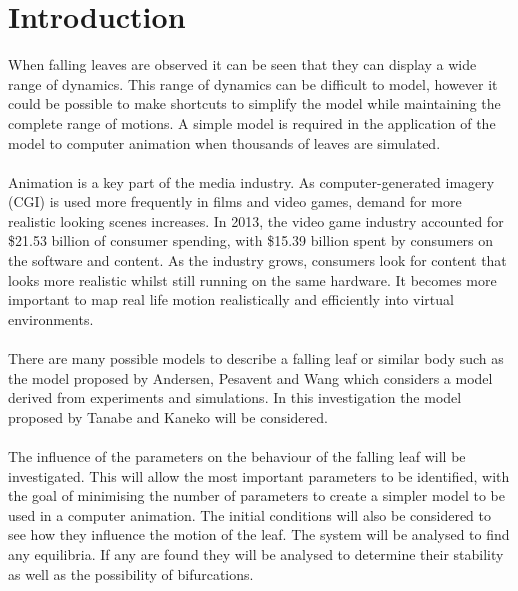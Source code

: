 \section{Introduction}
When falling leaves are observed it can be seen that they can display a wide range of dynamics. This range of dynamics can be difficult to model, however it could be possible to make shortcuts to simplify the model while maintaining the complete range of motions. A simple model is required in the application of the model to computer animation when thousands of leaves are simulated. 
\\
\\
\noindent Animation is a key part of the media industry. As computer-generated imagery (CGI) is used more frequently in films and video games, demand for more realistic looking scenes increases. In 2013, the video game industry accounted for \$21.53 billion of consumer spending, with \$15.39 billion spent by consumers on the software and content\textsuperscript{\cite{videogameindustry}}. As the industry grows, consumers look for content that looks more realistic whilst still running on the same hardware. It becomes more important to map real life motion realistically and efficiently into virtual environments. 
\\
\\
\noindent There are many possible models to describe a falling leaf or similar body such as the model proposed by Andersen, Pesavent and Wang which considers a model derived from experiments and simulations\textsuperscript{\cite{andersen2005analysis}}. In this investigation the model proposed by Tanabe and Kaneko will be considered\textsuperscript{\cite{tanabe1994behavior}}.
\\
\\
The influence of the parameters on the behaviour of the falling leaf will be investigated. This will allow the most important parameters to be identified, with the goal of minimising the number of parameters to create a simpler model to be used in a computer animation. The initial conditions will also be considered to see how they influence the motion of the leaf. The system will be analysed to find any equilibria. If any are found they will be analysed to determine their stability as well as the possibility of bifurcations. 
\\
